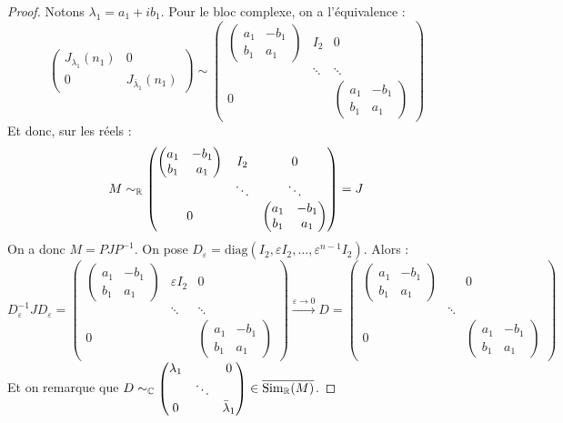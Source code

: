 \begin{proof}
    Notons $\lambda_1 = a_1 + i b_1$. Pour le bloc complexe, on a l'équivalence :
    \[
    \begin{pmatrix} J_{\lambda_1}(n_1) & 0 \\ 0 & J_{\bar{\lambda}_1}(n_1) \end{pmatrix} \sim \begin{pmatrix} \begin{pmatrix} a_1 & -b_1 \\ b_1 & a_1 \end{pmatrix} & I_2 & 0 \\ & \ddots & \ddots \\ 0 & & \begin{pmatrix} a_1 & -b_1 \\ b_1 & a_1 \end{pmatrix} \end{pmatrix}
    \]
    Et donc, sur les réels :
    \[
    M \sim_{\mathbb{R}} \begin{pmatrix} \begin{pmatrix} a_1 & -b_1 \\ b_1 & a_1 \end{pmatrix} & I_2 & 0 \\ & \ddots & \ddots \\ 0 & & \begin{pmatrix} a_1 & -b_1 \\ b_1 & a_1 \end{pmatrix} \end{pmatrix} = J
    \]
    On a donc $M = P J P^{-1}$. 
    On pose $D_\varepsilon = \text{diag}(I_2, \varepsilon I_2, \dots, \varepsilon^{n-1} I_2)$. Alors :
    \[
    D_\varepsilon^{-1} J D_\varepsilon = \begin{pmatrix} \begin{pmatrix} a_1 & -b_1 \\ b_1 & a_1 \end{pmatrix} & \varepsilon I_2 & 0 \\ & \ddots & \ddots \\ 0 & & \begin{pmatrix} a_1 & -b_1 \\ b_1 & a_1 \end{pmatrix} \end{pmatrix} \xrightarrow{\varepsilon \to 0} D = \begin{pmatrix} \begin{pmatrix} a_1 & -b_1 \\ b_1 & a_1 \end{pmatrix} & & 0 \\ & \ddots & \\ 0 & & \begin{pmatrix} a_1 & -b_1 \\ b_1 & a_1 \end{pmatrix} \end{pmatrix}
    \]
    Et on remarque que $D \sim_{\mathbb{C}} \begin{pmatrix} \lambda_1 & & 0 \\ & \ddots & \\ 0 & & \bar{\lambda}_1 \end{pmatrix} \in \overline{\operatorname{Sim}_{\mathbb{R}}(M)}$.
\end{proof}

